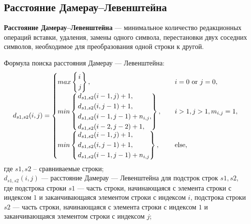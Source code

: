 \documentclass[14pt]{article}
\begin{document}
\newpage

\subsection{Расстояние Дамерау--Левенштейна}
\textbf{Расстояние Дамерау--Левенштейна} --- минимальное количество редакционных операций вставки, удаления, замены одного символа, перестановки двух соседних символов, необходимое для преобразования одной строки к другой.


Формула поиска расстояния Дамерау --- Левенштейна:
\begin{equation}
d_{s1,s2}(i,j) = 
\begin{cases}\label{for:Lev}
max\begin{cases}
	\begin{rcases}
		i\\
		j\\
	\end{rcases},
\end{cases} & i = 0 $ or $ j = 0,\\
min \begin{cases}
    \begin{rcases}
        d_{s1,s2}(i-1, j) + 1,\\
        d_{s1,s2}(i, j-1) + 1,\\
        d_{s1,s2}(i-1, j-1) + n_{i,j},\\
        d_{s1,s2}(i-2, j-2) + 1,\\
    \end{rcases},
    \end{cases} & i > 1, j > 1, m_{i,j} = 1,\\
min \begin{cases}
    \begin{rcases}
        d_{s1,s2}(i-1, j) + 1,\\
        d_{s1,s2}(i, j-1) + 1,\\
        d_{s1,s2}(i-1, j-1) + n_{i,j}\\
    \end{rcases},
\end{cases} & $else$,
\end{cases}
\end{equation}
где $s1, s2$ -- сравниваемые строки;\\
$d_{s1,s2}(i,j)$ --- расстояние Дамерау --- Левенштейна для подстрок строк $s1, s2$, где подстрока строки $s1$ --- часть строки, начинающаяся с элемента строки с индексом $1$ и заканчивающаяся элементом строки с индексом $i$, подстрока строки $s2$ --- часть строки, начинающаяся с элемента строки с индексом $1$ и заканчивающаяся элементом строки с индексом $j$;\\
\end{document}
